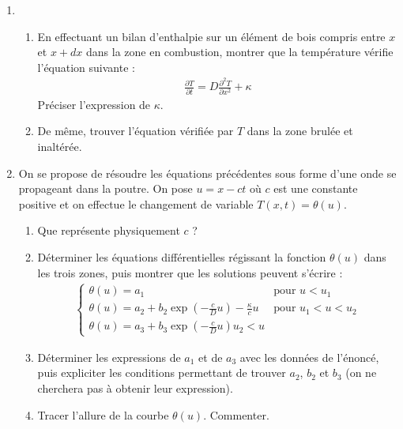 \begin{enumerate}

\item

\begin{enumerate}

\item En effectuant un bilan d'enthalpie sur un élément de bois compris entre $x$ et $x+dx$ dans la zone en combustion, montrer que la température vérifie l'équation suivante :
	\begin{align*}
		\frac{\partial T}{\partial t}=D\frac{\partial^2 T}{\partial x^2} + \kappa
	\end{align*}
	Préciser l'expression de $\kappa$.
	\item De même, trouver l'équation vérifiée par $T$ dans la zone brulée et inaltérée. 

\end{enumerate}

\item On se propose de résoudre les équations précédentes sous forme d’une onde se propageant dans la poutre. On pose $u=x-ct$ où $c$ est une constante positive et on effectue le changement de variable $T(x,t)=\theta(u)$.

\begin{enumerate}

\item Que représente physiquement $c$ ? 
	\item Déterminer les équations différentielles régissant la fonction $\theta(u)$ dans les trois zones, puis montrer que les solutions peuvent s'écrire :
	\begin{align*}
		\left\{
    \begin{array}{ll}
        \theta(u)=a_1 & \mbox{pour } u<u_1 \\
       \theta(u)=a_2 + b_2\exp\left( -\frac{c}{D}u\right)  - \frac{\kappa}{c}u & \mbox{pour } u_1<u<u_2 \\
       \theta(u)=a_3 + b_3\exp\left( -\frac{c}{D}u\right)  u_2<u
    \end{array}
\right.
	\end{align*}
	\item Déterminer les expressions de $a_1$ et de $a_3$ avec les données de l'énoncé, puis expliciter les conditions permettant de trouver $a_2$, $b_2$ et $b_3$ (on ne cherchera pas à obtenir leur expression).
	\item Tracer l'allure de la courbe $\theta(u)$. Commenter. 

\end{enumerate}

\end{enumerate}

